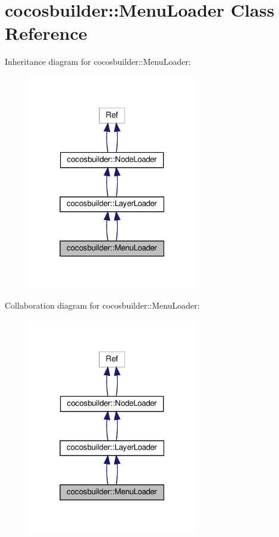 \hypertarget{classcocosbuilder_1_1MenuLoader}{}\section{cocosbuilder\+:\+:Menu\+Loader Class Reference}
\label{classcocosbuilder_1_1MenuLoader}


Inheritance diagram for cocosbuilder\+:\+:Menu\+Loader\+:
\nopagebreak
\begin{figure}[H]
\begin{center}
\leavevmode
\includegraphics[width=211pt]{classcocosbuilder_1_1MenuLoader__inherit__graph}
\end{center}
\end{figure}


Collaboration diagram for cocosbuilder\+:\+:Menu\+Loader\+:
\nopagebreak
\begin{figure}[H]
\begin{center}
\leavevmode
\includegraphics[width=211pt]{classcocosbuilder_1_1MenuLoader__coll__graph}
\end{center}
\end{figure}
